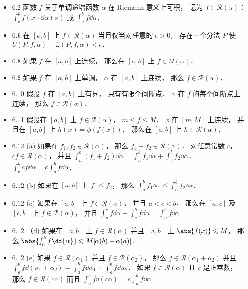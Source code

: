 \begin{itemize}
\item 6.2 函数 $f$ 关于单调递增函数 $\alpha$ 在 Riemann 意义上可积， 记为 $f\in \mathscr{R}(\alpha)$： $\int_a^b f(x) \dd\alpha(x)$ 或 $\int_a^b f\dd{\alpha}$．

\item 6.6 在 $[a,b]$ 上 $f\in\mathscr{R}(\alpha)$ 当且仅当对任意的 $\epsilon>0$， 存在一个分法 $P$ 使 $U(P,f,\alpha)-L(P,f,\alpha)<\epsilon$．

\item 6.8 如果 $f$ 在 $[a,b]$ 上连续， 那么在 $[a,b]$ 上 $f\in \mathscr{R}(\alpha)$．

\item 6.9 如果 $f$ 在 $[a,b]$ 上单调， $\alpha$ 在 $[a,b]$ 上连续， 那么 $f\in \mathscr{R}(\alpha)$．

\item 6.10 假设 $f$ 在 $[a,b]$ 上有界， 只有有限个间断点． $\alpha$ 在 $f$ 的每个间断点上连续， 那么 $f\in \mathscr{R}(\alpha)$．

\item 6.11 假设在 $[a,b]$ 上 $f\in \mathscr{R}(\alpha)$， $m\leqslant f\leqslant M$． $\phi$ 在 $[m, M]$ 上连续， 并且在 $[a,b]$ 上 $h(x) = \phi(f(x))$． 那么在 $[a,b]$ 上 $h\in \mathscr{R}(\alpha)$．

\item 6.12 (a) 如果在 $f_1,f_2 \in \mathscr{R}(\alpha)$， 那么 $f_1+f_2 \in \mathscr{R}(\alpha)$． 对任意常数 $c$， $cf\in \mathscr{R}(\alpha)$， 并且 $\int_a^b (f_1+f_2)\dd{\alpha} = \int_a^bf_1\dd{\alpha} + \int_a^bf_2\dd{\alpha}$． $\int_a^b cf\dd{\alpha} = c\int_a^b f\dd{\alpha}$．

\item  6.12 (b) 如果在 $[a,b]$ 上 $f_1\leqslant f_2$， 那么 $\int_a^bf_1\dd{\alpha} \leqslant \int_a^bf_2\dd{\alpha}$．

\item  6.12 (c) 如果在 $[a,b]$ 上 $f\in \mathscr{R}(\alpha)$， 并且 $a<c< b$， 那么在 $[a,c]$ 及 $[c,b]$ 上 $f\in \mathscr{R}(\alpha)$， 并且 $\int_a^cf\dd{\alpha}+\int_c^bf\dd{\alpha} = \int_a^bf\dd{\alpha}$

\item 6.12 （d) 如果在 $[a,b]$ 上 $f\in \mathscr{R}(\alpha)$ 并且 $[a,b]$ 上 $\abs{f(x)}\leqslant M$， 那么 $\abs{\int_a^bf\dd{\alpha}} \leqslant M[\alpha(b)-\alpha(a)]$．

\item 6.12 (e) 如果 $f\in \mathscr{R}(\alpha_1)$ 并且 $f\in \mathscr{R}(\alpha_2)$， 那么 $f\in \mathscr{R}(\alpha_1+\alpha_2)$ 并且 $\int_a^bf\dd{(\alpha_1+\alpha_2)} = \int_a^bf\dd{\alpha_1}+ \int_a^bf\dd{\alpha_2}$． 如果 $f\in \mathscr{R}(\alpha)$ 且 $c$ 是正常数， 那么 $f\in \mathscr{R}(c\alpha)$ 而且 $\int_a^bf\dd{(c\alpha)} = c\int_a^bf\dd{\alpha}$


\end{itemize}
